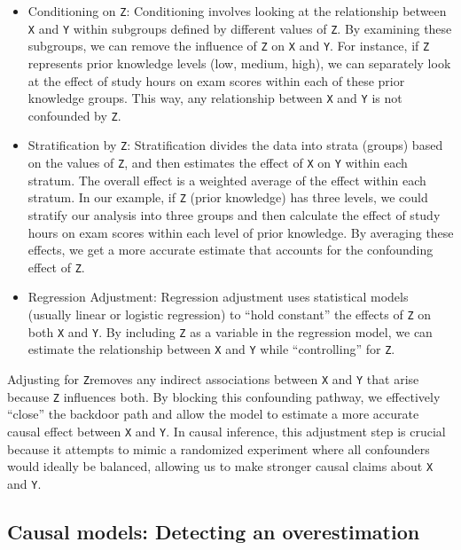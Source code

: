 \documentclass[
  12pt,
]{book}
\begin{document}
\begin{itemize}
\item
  Conditioning on \texttt{Z}: Conditioning involves looking at the relationship between \texttt{X} and \texttt{Y} within subgroups defined by different values of \texttt{Z}. By examining these subgroups, we can remove the influence of \texttt{Z} on \texttt{X} and \texttt{Y}. For instance, if \texttt{Z} represents prior knowledge levels (low, medium, high), we can separately look at the effect of study hours on exam scores within each of these prior knowledge groups. This way, any relationship between \texttt{X} and \texttt{Y} is not confounded by \texttt{Z}.
\item
  Stratification by \texttt{Z}: Stratification divides the data into strata (groups) based on the values of \texttt{Z}, and then estimates the effect of \texttt{X} on \texttt{Y} within each stratum. The overall effect is a weighted average of the effect within each stratum. In our example, if \texttt{Z} (prior knowledge) has three levels, we could stratify our analysis into three groups and then calculate the effect of study hours on exam scores within each level of prior knowledge. By averaging these effects, we get a more accurate estimate that accounts for the confounding effect of \texttt{Z}.
\item
  Regression Adjustment: Regression adjustment uses statistical models (usually linear or logistic regression) to ``hold constant'' the effects of \texttt{Z} on both \texttt{X} and \texttt{Y}. By including \texttt{Z} as a variable in the regression model, we can estimate the relationship between \texttt{X} and \texttt{Y} while ``controlling'' for \texttt{Z}.
\end{itemize}

Adjusting for \texttt{Z}removes any indirect associations between \texttt{X} and \texttt{Y} that arise because \texttt{Z} influences both. By blocking this confounding pathway, we effectively ``close'' the backdoor path and allow the model to estimate a more accurate causal effect between \texttt{X} and \texttt{Y}. In causal inference, this adjustment step is crucial because it attempts to mimic a randomized experiment where all confounders would ideally be balanced, allowing us to make stronger causal claims about \texttt{X} and \texttt{Y}.

\subsection{Causal models: Detecting an overestimation}\label{causal-models-overestimation}
\end{document}
